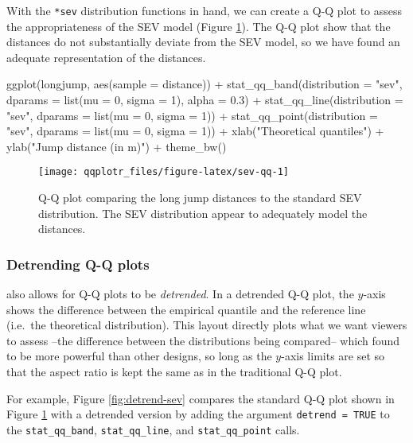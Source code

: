 With the \texttt{*sev} distribution functions in hand, we can create a
Q-Q plot to assess the appropriateness of the SEV model (Figure
\ref{fig:sev-qq}). The Q-Q plot show that the distances do not
substantially deviate from the SEV model, so we have found an adequate
representation of the distances.

\begin{Schunk}
\begin{Sinput}
ggplot(longjump, aes(sample = distance)) +
  stat_qq_band(distribution = "sev", dparams = list(mu = 0, sigma = 1), alpha = 0.3) +
  stat_qq_line(distribution = "sev", dparams = list(mu = 0, sigma = 1)) +
  stat_qq_point(distribution = "sev", dparams = list(mu = 0, sigma = 1)) +
  xlab("Theoretical quantiles") +
  ylab("Jump distance (in m)") +
  theme_bw()
\end{Sinput}
\begin{figure}

{\centering \texttt{[image: qqplotr\_files/figure-latex/sev-qq-1]} 

}

\caption[Q-Q plot comparing the long jump distances to the standard SEV distribution]{Q-Q plot comparing the long jump distances to the standard SEV distribution. The SEV distribution appear to adequately model the distances.}\label{fig:sev-qq}
\end{figure}
\end{Schunk}

\subsubsection{Detrending Q-Q plots}\label{detrending-q-q-plots}

\label{sec:detrending}

 also allows for Q-Q plots to be \emph{detrended}. In a
detrended Q-Q plot, the \(y\)-axis shows the difference between the
empirical quantile and the reference line (i.e.~the theoretical
distribution). This layout directly plots what we want viewers to assess
--the difference between the distributions being compared-- which
\citet{Loy2016-fg} found to be more powerful than other designs, so long
as the \(y\)-axis limits are set so that the aspect ratio is kept the
same as in the traditional Q-Q plot.

For example, Figure \ref{fig:detrend-sev} compares the standard Q-Q plot
shown in Figure \ref{fig:sev-qq} with a detrended version by adding the
argument \texttt{detrend\ =\ TRUE} to the \texttt{stat\_qq\_band},
\texttt{stat\_qq\_line}, and \texttt{stat\_qq\_point} calls.

